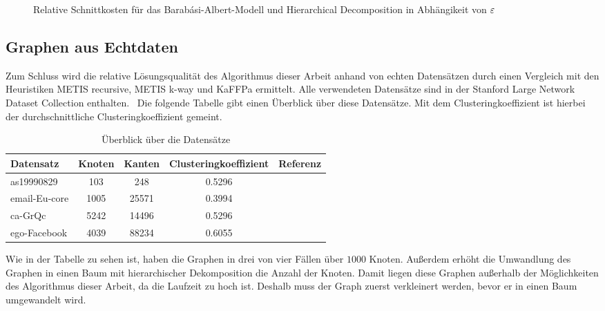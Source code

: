 \begin{figure}[H]
    \centering
    
    \caption{Relative Schnittkosten für das Barabási-Albert-Modell und Hierarchical Decomposition in Abhängikeit von $\varepsilon$\label{fig:prefattachhdecompimb}}
\end{figure}

\subsection{Graphen aus Echtdaten}
Zum Schluss wird die relative Lösungsqualität des Algorithmus dieser Arbeit anhand von echten Datensätzen durch einen Vergleich mit den Heuristiken METIS recursive, METIS k-way und KaFFPa ermittelt.
Alle verwendeten Datensätze sind in der Stanford Large Network Dataset Collection enthalten.~\cite{LK14}
Die folgende Tabelle gibt einen Überblick über diese Datensätze.
Mit dem Clusteringkoeffizient ist hierbei der durchschnittliche Clusteringkoeffizient gemeint.

\vspace{0.5cm}
\begin{table}[H]
    \centering
    \begin{tabular}{lcccc}
        \toprule
        Datensatz & Knoten & Kanten & Clusteringkoeffizient & Referenz \\
        \midrule
        as19990829 & 103 & 248 & 0.5296 & \cite{LKF05} \\
        email-Eu-core & 1005 & 25571 & 0.3994 & \cite{LKF07} \\
        ca-GrQc & 5242 & 14496 & 0.5296 & \cite{LKF07} \\
        ego-Facebook & 4039 & 88234 & 0.6055 & \cite{ML14} \\
        \bottomrule
    \end{tabular}
    \caption{Überblick über die Datensätze}
\end{table}

Wie in der Tabelle zu sehen ist, haben die Graphen in drei von vier Fällen über $1000$ Knoten.
Außerdem erhöht die Umwandlung des Graphen in einen Baum mit hierarchischer Dekomposition die Anzahl der Knoten. 
Damit liegen diese Graphen außerhalb der Möglichkeiten des Algorithmus dieser Arbeit, da die Laufzeit zu hoch ist.
Deshalb muss der Graph zuerst verkleinert werden, bevor er in einen Baum umgewandelt wird.

